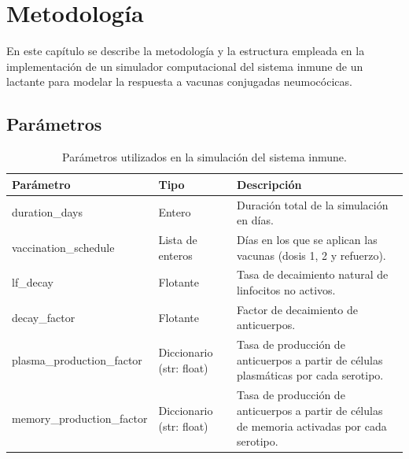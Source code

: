 \chapter{Metodología}\label{chapter:metodologia}

En este capítulo se describe la metodología y la estructura empleada en la implementación de un simulador computacional del sistema inmune de un lactante para modelar la respuesta a vacunas conjugadas neumocócicas.

\section{Parámetros}
\begin{table}[H]
\centering
\caption{Parámetros utilizados en la simulación del sistema inmune.}
\label{tab:parametros_simulacion}
\begin{tabular}{|l|p{2cm}|p{5cm}|}
\hline
\textbf{Parámetro} & \textbf{Tipo} & \textbf{Descripción} \\ \hline
duration\_days & Entero & Duración total de la simulación en días. \\ \hline
vaccination\_schedule & Lista de enteros & Días en los que se aplican las vacunas (dosis 1, 2 y refuerzo). \\ \hline
lf\_decay & Flotante & Tasa de decaimiento natural de linfocitos no activos. \\ \hline
decay\_factor & Flotante & Factor de decaimiento de anticuerpos. \\ \hline
plasma\_production\_factor & Diccionario (str: float) & Tasa de producción de anticuerpos a partir de células plasmáticas por cada serotipo. \\ \hline
memory\_production\_factor & Diccionario (str: float) & Tasa de producción de anticuerpos a partir de células de memoria activadas por cada serotipo. \\ \hline
\end{tabular}
\end{table}



